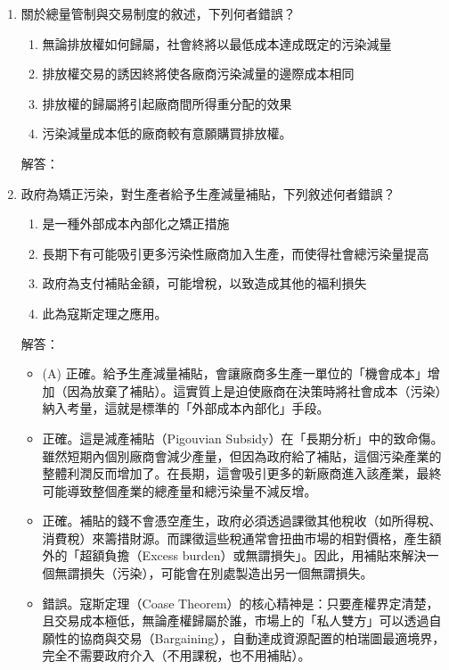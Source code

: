\documentclass[12pt, a4paper]{article}
\begin{document}
\begin{enumerate}
    \newpage

    \item 關於總量管制與交易制度的敘述，下列何者錯誤？
    \begin{enumerate}[label=\Alph*.]
        \item 無論排放權如何歸屬，社會終將以最低成本達成既定的污染減量
        \item 排放權交易的誘因終將使各廠商污染減量的邊際成本相同
        \item 排放權的歸屬將引起廠商間所得重分配的效果
        \item 污染減量成本低的廠商較有意願購買排放權。
    \end{enumerate}
    解答：
    \vspace{2cm}

    \item 政府為矯正污染，對生產者給予生產減量補貼，下列敘述何者錯誤？
    \begin{enumerate}[label=\Alph*.]
        \item 是一種外部成本內部化之矯正措施
        \item 長期下有可能吸引更多污染性廠商加入生產，而使得社會總污染量提高
        \item 政府為支付補貼金額，可能增稅，以致造成其他的福利損失
        \item 此為寇斯定理之應用。
    \end{enumerate}
    解答：
    \begin{itemize}
        \item (A) 正確。給予生產減量補貼，會讓廠商多生產一單位的「機會成本」增加（因為放棄了補貼）。這實質上是迫使廠商在決策時將社會成本（污染）納入考量，這就是標準的「外部成本內部化」手段。
        \item 正確。這是減產補貼（Pigouvian Subsidy）在「長期分析」中的致命傷。雖然短期內個別廠商會減少產量，但因為政府給了補貼，這個污染產業的整體利潤反而增加了。在長期，這會吸引更多的新廠商進入該產業，最終可能導致整個產業的總產量和總污染量不減反增。
        \item 正確。補貼的錢不會憑空產生，政府必須透過課徵其他稅收（如所得稅、消費稅）來籌措財源。而課徵這些稅通常會扭曲市場的相對價格，產生額外的「超額負擔（Excess burden）或無謂損失」。因此，用補貼來解決一個無謂損失（污染），可能會在別處製造出另一個無謂損失。
        \item 錯誤。寇斯定理（Coase Theorem）的核心精神是：只要產權界定清楚，且交易成本極低，無論產權歸屬於誰，市場上的「私人雙方」可以透過自願性的協商與交易（Bargaining），自動達成資源配置的柏瑞圖最適境界，完全不需要政府介入（不用課稅，也不用補貼）。
    \end{itemize}


\end{enumerate}
\end{document}
